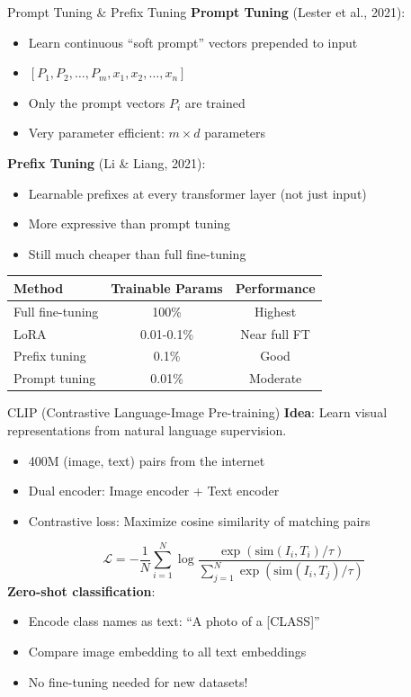 \documentclass[11pt]{beamer}
\begin{document}
\begin{frame}{Prompt Tuning \& Prefix Tuning}
    \textbf{Prompt Tuning} (Lester et al., 2021):
    \begin{itemize}
        \item Learn continuous ``soft prompt'' vectors prepended to input
        \item $[P_1, P_2, \ldots, P_m, x_1, x_2, \ldots, x_n]$
        \item Only the prompt vectors $P_i$ are trained
        \item Very parameter efficient: $m \times d$ parameters
    \end{itemize}
    \vfill
    \textbf{Prefix Tuning} (Li \& Liang, 2021):
    \begin{itemize}
        \item Learnable prefixes at every transformer layer (not just input)
        \item More expressive than prompt tuning
        \item Still much cheaper than full fine-tuning
    \end{itemize}
    \vfill
    \centering
    \begin{tabular}{lcc}
        \toprule
        Method & Trainable Params & Performance \\
        \midrule
        Full fine-tuning & 100\% & Highest \\
        LoRA & 0.01-0.1\% & Near full FT \\
        Prefix tuning & 0.1\% & Good \\
        Prompt tuning & 0.01\% & Moderate \\
        \bottomrule
    \end{tabular}
\end{frame}

\begin{frame}{CLIP (Contrastive Language-Image Pre-training)}
    \textbf{Idea}: Learn visual representations from natural language supervision.
    \begin{itemize}
        \item 400M (image, text) pairs from the internet
        \item Dual encoder: Image encoder + Text encoder
        \item Contrastive loss: Maximize cosine similarity of matching pairs
    \end{itemize}
    \[
        \mathcal{L} = -\frac{1}{N}\sum_{i=1}^{N} \log \frac{\exp(\text{sim}(I_i, T_i)/\tau)}{\sum_{j=1}^{N} \exp(\text{sim}(I_i, T_j)/\tau)}
    \]
    \vfill
    \textbf{Zero-shot classification}:
    \begin{itemize}
        \item Encode class names as text: ``A photo of a [CLASS]''
        \item Compare image embedding to all text embeddings
        \item No fine-tuning needed for new datasets!
    \end{itemize}
\end{frame}
\end{document}
